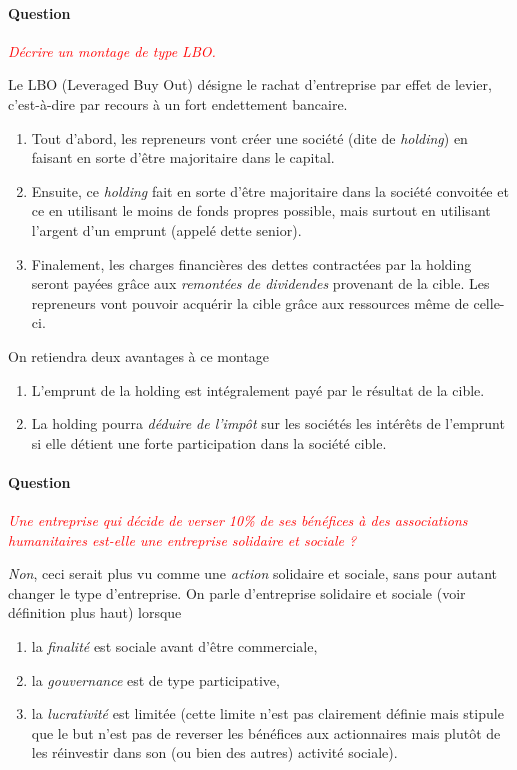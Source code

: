 \documentclass[12pt,oneside,a4paper]{article}
\newcommand{\question}[1]
{
\addtocounter{section}{1}
\paragraph*{Question \thesection}
\emph{\textcolor{red}{#1}}
}
\begin{document}
\question{Décrire un montage de type LBO.}
Le LBO (Leveraged Buy Out) désigne le rachat d'entreprise par effet de levier,
c'est-à-dire par recours à un fort endettement bancaire.
\begin{enumerate}
  \item Tout d'abord, les repreneurs vont créer une société (dite de \emph{holding})
  en faisant en sorte d'être majoritaire dans le capital.
  \item Ensuite, ce \emph{holding} fait en sorte d'être majoritaire dans la société
  convoitée et ce en utilisant le moins de fonds propres possible, mais surtout
  en utilisant l'argent d'un emprunt (appelé dette senior).
  \item Finalement, les charges financières des dettes contractées par la holding
  seront payées grâce aux \emph{remontées de dividendes} provenant de la cible. 
  Les repreneurs vont pouvoir acquérir la cible grâce aux ressources même de celle-ci.
\end{enumerate}
On retiendra deux avantages à ce montage
\begin{enumerate}
  \item L'emprunt de la holding est intégralement payé par le résultat de la cible.
  \item La holding pourra \emph{déduire de l’impôt} sur les sociétés les intérêts de 
  l’emprunt si elle détient une forte participation dans la société cible.
\end{enumerate}

\question{Une entreprise qui décide de verser 10\% de ses bénéfices à des associations
humanitaires est-elle une entreprise solidaire et sociale ?}
\emph{Non}, ceci serait plus vu comme une \emph{action} solidaire et sociale,
sans pour autant changer le type d'entreprise.
On parle d'entreprise solidaire et sociale (voir définition plus haut)
lorsque 
\begin{enumerate}
  \item la \emph{finalité} est sociale avant d'être commerciale,
  \item la \emph{gouvernance} est de type participative,
  \item la \emph{lucrativité} est limitée (cette limite n'est pas clairement définie
  mais stipule que le but n'est pas de reverser les bénéfices aux actionnaires
  mais plutôt de les réinvestir dans son (ou bien des autres) activité sociale).
\end{enumerate}
 
\end{document}

